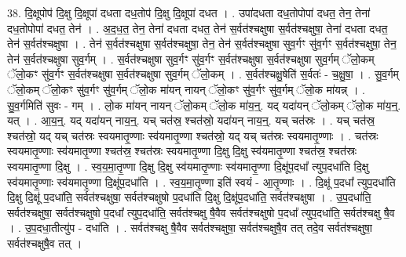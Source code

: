 \documentclass[17pt]{extarticle}
\begin{document}
38. दि॒क्षूपोप॑ दि॒क्षु दि॒क्षूपा॑ दधता दध॒तोप॑ दि॒क्षु दि॒क्षूपा॑ दधत । . उपा॑दधता दध॒तोपोपा॑ दधत॒ तेन॒ तेना॑ दध॒तोपोपा॑ दधत॒ तेन॑ । . अ॒द॒ध॒त॒ तेन॒ तेना॑ दधता दधत॒ तेन॑ स॒र्वत॑श्चक्षुषा स॒र्वत॑श्चक्षुषा॒ तेना॑ दधता दधत॒ तेन॑ स॒र्वत॑श्चक्षुषा । . तेन॑ स॒र्वत॑श्चक्षुषा स॒र्वत॑श्चक्षुषा॒ तेन॒ तेन॑ स॒र्वत॑श्चक्षुषा सुव॒र्गꣳ सु॑व॒र्गꣳ स॒र्वत॑श्चक्षुषा॒ तेन॒ तेन॑ स॒र्वत॑श्चक्षुषा सुव॒र्गम् । . स॒र्वत॑श्चक्षुषा सुव॒र्गꣳ सु॑व॒र्गꣳ स॒र्वत॑श्चक्षुषा स॒र्वत॑श्चक्षुषा सुव॒र्गम् ॅलो॒कम् ॅलो॒कꣳ सु॑व॒र्गꣳ स॒र्वत॑श्चक्षुषा स॒र्वत॑श्चक्षुषा सुव॒र्गम् ॅलो॒कम् । . स॒र्वत॑श्चक्षु॒षेति॑ स॒र्वतः॑ - च॒क्षु॒षा॒ । . सु॒व॒र्गम् ॅलो॒कम् ॅलो॒कꣳ सु॑व॒र्गꣳ सु॑व॒र्गम् ॅलो॒क मा॑यन् ‍नायन् ॅलो॒कꣳ सु॑व॒र्गꣳ सु॑व॒र्गम् ॅलो॒क मा॑यन्न् । . सु॒व॒र्गमिति॑ सुवः - गम् । . लो॒क मा॑यन् नायन् ॅलो॒कम् ॅलो॒क मा॑य॒न्॒. यद् यदा॑यन् ॅलो॒कम् ॅलो॒क मा॑य॒न्॒. यत् । . आ॒य॒न्॒. यद् यदा॑यन् नाय॒न्॒. यच् चत॑स्र॒ श्चत॑स्रो॒ यदा॑यन् नाय॒न्॒. यच् चत॑स्रः । . यच् चत॑स्र॒ श्चत॑स्रो॒ यद् यच् चत॑स्रः स्वयमातृ॒ण्णाः स्व॑यमातृ॒ण्णा श्चत॑स्रो॒ यद् यच् चत॑स्रः स्वयमातृ॒ण्णाः । . चत॑स्रः स्वयमातृ॒ण्णाः स्व॑यमातृ॒ण्णा श्चत॑स्र॒ श्चत॑स्रः स्वयमातृ॒ण्णा दि॒क्षु दि॒क्षु स्व॑यमातृ॒ण्णा श्चत॑स्र॒ श्चत॑स्रः स्वयमातृ॒ण्णा दि॒क्षु । . स्व॒य॒मा॒तृ॒ण्णा दि॒क्षु दि॒क्षु स्व॑यमातृ॒ण्णाः स्व॑यमातृ॒ण्णा दि॒क्षू॑प॒दधा᳚ त्युप॒दधा॑ति दि॒क्षु स्व॑यमातृ॒ण्णाः स्व॑यमातृ॒ण्णा दि॒क्षू॑प॒दधा॑ति । . स्व॒य॒मा॒तृ॒ण्णा इति॑ स्वयं - आ॒तृ॒ण्णाः । . दि॒क्षू॑ प॒दधा᳚ त्युप॒दधा॑ति दि॒क्षु दि॒क्षू॑ प॒दधा॑ति॒ सर्वत॑श्चक्षुषा॒ सर्वत॑श्चक्षुषो प॒दधा॑ति दि॒क्षु दि॒क्षू॑प॒दधा॑ति॒ सर्वत॑श्चक्षुषा । . उ॒प॒दधा॑ति॒ सर्वत॑श्चक्षुषा॒ सर्वत॑श्चक्षुषो प॒दधा᳚ त्युप॒दधा॑ति॒ सर्वत॑श्चक्षु षै॒वैव सर्वत॑श्चक्षुषो प॒दधा᳚ त्युप॒दधा॑ति॒ सर्वत॑श्चक्षु षै॒व । . उ॒प॒दधा॒तीत्यु॑प - दधा॑ति । . सर्वत॑श्चक्षु षै॒वैव सर्वत॑श्चक्षुषा॒ सर्वत॑श्चक्षुषै॒व तत् तदे॒व सर्वत॑श्चक्षुषा॒ सर्वत॑श्चक्षुषै॒व तत् । \newline
\end{document}
